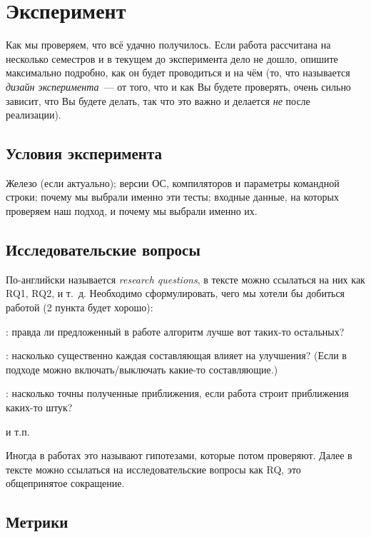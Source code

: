 
\section{Эксперимент}
Как мы проверяем, что всё удачно получилось.
Если работа рассчитана на несколько семестров и в текущем до эксперимента дело не дошло, опишите максимально подробно, как он будет прово\-диться и на чём
(то, что называется \emph{дизайн эксперимента}~--- от того, что и как Вы будете проверять, очень сильно зависит, что Вы будете делать, так что это важно и делается \emph{не} после реализации).

\subsection{Условия эксперимента}
Железо (если актуально);
версии ОС, компиляторов и параметры командной строки;
почему мы выбрали именно эти тесты; входные дан\-ные, на которых проверяем наш подход, и почему мы выбрали именно их.

\subsection{Исследовательские вопросы }
По-английски называется \emph{research questions}, в тексте можно ссылаться на них как RQ1, RQ2, и т.~д.
Необходимо сформулировать, чего мы хотели бы добиться работой (2 пункта будет хорошо):

\begin{description}
    \item[RQ1]: правда ли предложенный в работе алгоритм лучше вот таких-то остальных?
    \item[RQ2]: насколько существенно каждая составляющая влияет на улучшения?
          (Если в подходе можно включать/выключать какие-то составляющие.)
    \item[RQ3]: насколько точны полученные приближения, если работа строит приближения каких-то штук?
    \item и т.п.
\end{description}

Иногда в работах это называют гипотезами, которые потом проверяют.
Далее в тексте можно ссылаться на исследовательские вопросы как \textsc{RQ}, это обще\-при\-нятое сокращение.

\subsection{Метрики}

